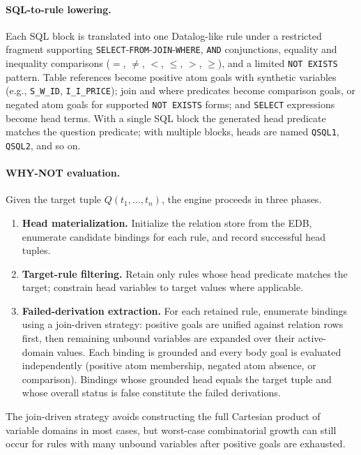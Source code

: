 \documentclass{llncs}
\begin{document}
\paragraph{SQL-to-rule lowering.}
Each SQL block is translated into one Datalog-like rule under a
restricted fragment supporting
\texttt{SELECT}-\texttt{FROM}-\texttt{JOIN}-\texttt{WHERE},
\texttt{AND} conjunctions,
equality and inequality comparisons ($=$, $\neq$, $<$, $\leq$, $>$,
$\geq$), and a limited \texttt{NOT EXISTS} pattern.
Table references become positive atom goals with synthetic variables
(e.g., \texttt{S\_W\_ID}, \texttt{I\_I\_PRICE});
join and where predicates become comparison goals, or negated atom goals
for supported \texttt{NOT EXISTS} forms;
and \texttt{SELECT} expressions become head terms.
With a single SQL block the generated head predicate matches the
question predicate; with multiple blocks, heads are named
\texttt{QSQL1}, \texttt{QSQL2}, and so on.

\paragraph{WHY-NOT evaluation.}
Given the target tuple $Q(t_1,\ldots,t_n)$, the engine proceeds in
three phases.
\begin{enumerate}
  \item \textbf{Head materialization.} Initialize the relation store
    from the EDB, enumerate candidate bindings for each rule, and
    record successful head tuples.
  \item \textbf{Target-rule filtering.} Retain only rules whose head
    predicate matches the target; constrain head variables to target
    values where applicable.
  \item \textbf{Failed-derivation extraction.} For each retained rule,
    enumerate bindings using a join-driven strategy: positive goals are
    unified against relation rows first, then remaining unbound variables
    are expanded over their active-domain values.
    Each binding is grounded and every body goal is evaluated
    independently (positive atom membership, negated atom absence, or
    comparison).
    Bindings whose grounded head equals the target tuple and whose
    overall status is false constitute the failed derivations.
\end{enumerate}
The join-driven strategy avoids constructing the full Cartesian product
of variable domains in most cases, but worst-case combinatorial growth
can still occur for rules with many unbound variables after positive
goals are exhausted.
\end{document}
